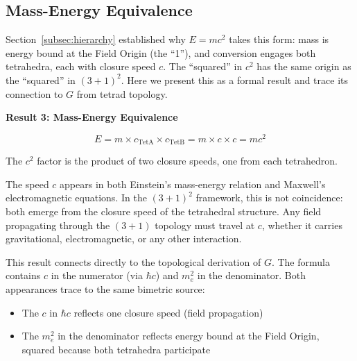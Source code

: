\documentclass[aps,prd,preprint,superscriptaddress,showpacs,preprintnumbers,amsmath,amssymb,nofootinbib]{revtex4-2}
\begin{document}
\subsection{Mass-Energy Equivalence}
\label{subsec:emc2}

Section~\ref{subsec:hierarchy} established why $E = mc^2$ takes this form: mass is energy bound at the Field Origin (the ``1''), and conversion engages both tetrahedra, each with closure speed $c$. The ``squared'' in $c^2$ has the same origin as the ``squared'' in $(3+1)^2$. Here we present this as a formal result and trace its connection to $G$ from tetrad topology.

\vspace{1.5em}
\noindent
\colorbox{resultgreen}{\parbox{\dimexpr\textwidth-2\fboxsep\relax}{%
\vspace{0.8em}
\centering
\textbf{\large Result 3: Mass-Energy Equivalence}

\vspace{0.5em}
\boldmath
\begin{equation}
E = m \times c_{\text{TetA}} \times c_{\text{TetB}} = m \times c \times c = mc^2
\end{equation}
\unboldmath

\vspace{0.3em}
The $c^2$ factor is the product of two closure speeds, one from each tetrahedron.
\vspace{0.5em}
}}
\vspace{1cm}

The speed $c$ appears in both Einstein's mass-energy relation and Maxwell's electromagnetic equations. In the $(3+1)^2$ framework, this is not coincidence: both emerge from the closure speed of the tetrahedral structure. Any field propagating through the $(3+1)$ topology must travel at $c$, whether it carries gravitational, electromagnetic, or any other interaction.

This result connects directly to the topological derivation of $G$. The formula contains $c$ in the numerator (via $\hbar c$) and $m_e^2$ in the denominator. Both appearances trace to the same bimetric source:

\begin{itemize}
\item The $c$ in $\hbar c$ reflects one closure speed (field propagation)
\item The $m_e^2$ in the denominator reflects energy bound at the Field Origin, squared because both tetrahedra participate
\end{itemize}
\end{document}
